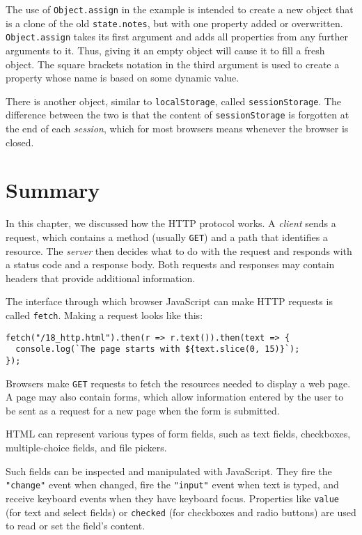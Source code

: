 The use of \lstinline`Object.assign` in the example is intended to create a new object that is a clone of the old \lstinline`state.notes`, but with one property added or overwritten. \lstinline`Object.assign` takes its first argument and adds all properties from any further arguments to it. Thus, giving it an empty object will cause it to fill a fresh object. The square
brackets notation in the third argument is used to create a property whose name is based on some dynamic value.

There is another object, similar to \lstinline`localStorage`, called \lstinline`sessionStorage`. The difference between the two is that the content of \lstinline`sessionStorage` is forgotten at the end of each \emph{session}, which for most browsers means whenever the browser is closed.

\section{Summary}

In this chapter, we discussed how the HTTP protocol works. A \emph{client} sends a request, which contains a method (usually \lstinline`GET`) and a path that identifies a resource. The \emph{server} then decides what to do with the request and responds with a status code and a response body. Both requests and responses may contain headers that provide additional information.

The interface through which browser JavaScript can make HTTP requests is called \lstinline`fetch`. Making a request looks like this:

\begin{lstlisting}
fetch("/18_http.html").then(r => r.text()).then(text => {
  console.log(`The page starts with ${text.slice(0, 15)}`);
});
\end{lstlisting}
\noindent

Browsers make \lstinline`GET` requests to fetch the resources needed to display a web page. A page may also contain forms, which allow information entered by the user to be sent as a request for a new page when the form is submitted.

HTML can represent various types of form fields, such as text fields, checkboxes, multiple-choice fields, and file pickers.

Such fields can be inspected and manipulated with JavaScript. They fire the \lstinline`"change"` event when changed, fire the \lstinline`"input"` event when text is typed, and receive keyboard events when they have keyboard focus. Properties like \lstinline`value` (for text and select fields) or \lstinline`checked` (for checkboxes and radio buttons) are used to read or set the field's content.

